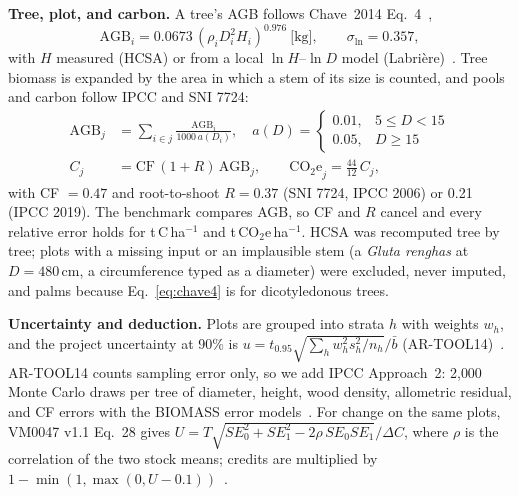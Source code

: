 \documentclass[conference,a4paper]{IEEEtran}
\begin{document}
\textbf{Tree, plot, and carbon.} A tree's AGB follows Chave~2014 Eq.~4~\cite{chave2014improved},
\begin{equation}
\mathrm{AGB}_i=0.0673\,(\rho_i D_i^2 H_i)^{0.976}\ \text{[kg]},\qquad \sigma_{\ln}=0.357,
\label{eq:chave4}
\end{equation}
with $H$ measured (HCSA) or from a local $\ln H$--$\ln D$ model (Labri\`ere)~\cite{rejou2017biomass}. Tree biomass is expanded by the area in which a stem of its size is counted, and pools and carbon follow IPCC and SNI 7724:
\begin{equation}
\begin{aligned}
\mathrm{AGB}_j&=\sum_{i\in j}\frac{\mathrm{AGB}_i}{1000\,a(D_i)},\quad a(D)=\begin{cases}0.01,&5\le D<15\\0.05,&D\ge 15\end{cases}\\
C_j&=\mathrm{CF}\,(1+R)\,\mathrm{AGB}_j,\qquad \mathrm{CO_2e}_j=\tfrac{44}{12}\,C_j,
\end{aligned}
\label{eq:plot}
\end{equation}
with CF $=0.47$ and root-to-shoot $R=0.37$ (SNI 7724, IPCC 2006) or 0.21 (IPCC 2019). The benchmark compares AGB, so CF and $R$ cancel and every relative error holds for t\,C\,ha$^{-1}$ and t\,CO$_2$e\,ha$^{-1}$. HCSA was recomputed tree by tree; plots with a missing input or an implausible stem (a \textit{Gluta renghas} at $D=480$\,cm, a circumference typed as a diameter) were excluded, never imputed, and palms because Eq.~\ref{eq:chave4} is for dicotyledonous trees.

\textbf{Uncertainty and deduction.} Plots are grouped into strata $h$ with weights $w_h$, and the project uncertainty at 90\% is $u=t_{0.95}\sqrt{\sum_h w_h^2s_h^2/n_h}/\bar b$ (AR-TOOL14)~\cite{artool14}. AR-TOOL14 counts sampling error only, so we add IPCC Approach~2: 2{,}000 Monte Carlo draws per tree of diameter, height, wood density, allometric residual, and CF errors with the BIOMASS error models~\cite{rejou2017biomass}. For change on the same plots, VM0047 v1.1 Eq.~28 gives $U=T\sqrt{SE_0^2+SE_1^2-2\rho\,SE_0SE_1}/\Delta C$, where $\rho$ is the correlation of the two stock means; credits are multiplied by $1-\min(1,\max(0,U-0.1))$~\cite{verra2025vm0047}.
\end{document}
